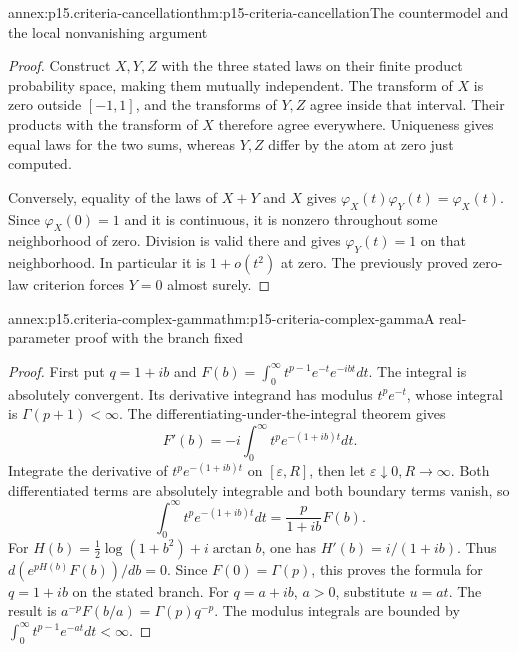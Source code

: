 \begin{annexitem}{annex:p15.criteria-cancellation}{thm:p15-criteria-cancellation}{The countermodel and the local nonvanishing argument}
\begin{proof}
Construct \(X,Y,Z\) with the three stated laws on their
finite product probability space, making them mutually
independent. The transform of \(X\) is zero outside
\([-1,1]\), and the transforms of \(Y,Z\) agree inside
that interval. Their products with the transform of
\(X\) therefore agree everywhere.
Uniqueness gives equal laws for the two sums, whereas
\(Y,Z\) differ by the atom at zero just computed.

Conversely, equality of the laws of \(X+Y\) and \(X\)
gives \(\varphi_X(t)\varphi_Y(t)=\varphi_X(t)\).
Since \(\varphi_X(0)=1\) and it is continuous, it is
nonzero throughout some neighborhood of zero.
Division is valid there and gives \(\varphi_Y(t)=1\)
on that neighborhood. In particular it is
\(1+o(t^2)\) at zero. The previously proved zero-law
criterion forces \(Y=0\) almost surely.
\end{proof}
\end{annexitem}

\begin{annexitem}{annex:p15.criteria-complex-gamma}{thm:p15-criteria-complex-gamma}{A real-parameter proof with the branch fixed}
\begin{proof}
First put \(q=1+ib\) and
\(F(b)=\int_0^\infty t^{p-1}e^{-t}e^{-ibt}dt\).
The integral is absolutely convergent.
Its derivative integrand has modulus \(t^pe^{-t}\),
whose integral is \(\Gamma(p+1)<\infty\).
The differentiating-under-the-integral theorem gives
\[
 F'(b)=-i\int_0^\infty t^p e^{-(1+ib)t}dt.
\]
Integrate the derivative of \(t^pe^{-(1+ib)t}\)
on \([\varepsilon,R]\), then let
\(\varepsilon\downarrow0,R\to\infty\).
Both differentiated terms are absolutely integrable
and both boundary terms vanish, so
\[
 \int_0^\infty t^pe^{-(1+ib)t}dt=\frac{p}{1+ib}F(b).
\]
For \(H(b)=\tfrac12\log(1+b^2)+i\arctan b\),
one has \(H'(b)=i/(1+ib)\).
Thus \(d(e^{pH(b)}F(b))/db=0\).
Since \(F(0)=\Gamma(p)\), this proves the formula
for \(q=1+ib\) on the stated branch.
For \(q=a+ib\), \(a>0\), substitute \(u=at\).
The result is \(a^{-p}F(b/a)=\Gamma(p)q^{-p}\).
The modulus integrals are bounded by
\(\int_0^\infty t^{p-1}e^{-at}dt<\infty\).
\end{proof}
\end{annexitem}

